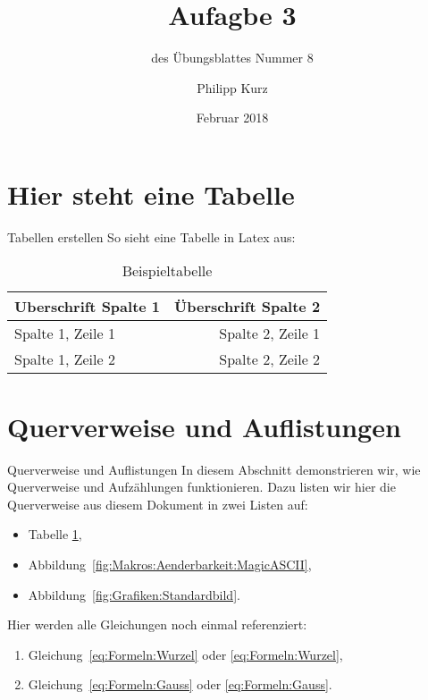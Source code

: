 \documentclass[12pt,ngerman,a4paper]{beamer}
\title{Aufagbe 3}
\subtitle{des Übungsblattes Nummer 8}
\date{Februar 2018}
\author{Philipp Kurz}
\begin{document}
\maketitle

\begin{frame}
  \tableofcontents{}
\end{frame}


\section{Hier steht eine Tabelle}
\begin{frame}{Tabellen erstellen}
So sieht eine Tabelle in Latex aus:

\begin{table}[h!]
  \centering
  \begin{tabular}{|l||r|}
    \hline
    \textbf{Uberschrift Spalte 1}             & \textbf{Überschrift Spalte 2}\\
    \hline
    Spalte 1, Zeile 1	               & Spalte 2, Zeile 1\\
    \hline
    Spalte 1, Zeile 2               & Spalte 2, Zeile 2\\
    \hline
  \end{tabular}
  \caption{Beispieltabelle}
  \label{tab:Tabellen:HHGGDarsteller}
\end{table}
\end{frame}

\section{Querverweise und Auflistungen}\label{sec:QuerverweiseUndAuflistungen}
\begin{frame}{Querverweise und Auflistungen}
In diesem Abschnitt demonstrieren wir, wie Querverweise und Aufzählungen funktionieren. Dazu listen wir hier die Querverweise aus diesem Dokument in zwei Listen auf:
\begin{itemize}
  \item Tabelle \ref{tab:Tabellen:HHGGDarsteller},
  \item Abbildung~\ref{fig:Makros:Aenderbarkeit:MagicASCII},
  \item Abbildung~\ref{fig:Grafiken:Standardbild}.
\end{itemize}
Hier werden alle Gleichungen noch einmal referenziert:
\begin{enumerate}
  \item Gleichung~\ref{eq:Formeln:Wurzel} oder \eqref{eq:Formeln:Wurzel},
  \item Gleichung~\ref{eq:Formeln:Gauss} oder \eqref{eq:Formeln:Gauss}.
\end{enumerate}
\end{frame}
\end{document}

